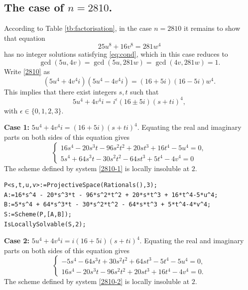 \documentclass[a4paper,12pt,english,reqno]{amsart}
\begin{document}
\subsection{The case of $n=2810$.}%
According to Table \ref{tb:factorisation}, in the case $n=2810$ it remains to
show that equation 
\begin{equation}\label{2810}
25 u^8 + 16 v^8=281  w^4
\end{equation}
has no integer solutions satisfying \eqref{eq:cond}, which in this case reduces to \[\gcd(5u,4v)=\gcd(5u,281w)=\gcd(4v,281w)=1.\]   Write \eqref{2810} as
\begin{equation} (5u^4+4v^4i)(5u^4-4v^4i)=(16+5i)(16-5i)w^4.
\end{equation}
This implies that there exist integers $s,t$ such that 
\[5u^4+4v^4i=i^{\epsilon}(16\pm 5i)(s+ti)^4,\]
with $\epsilon \in \{0,1,2,3\}$.


{\bf Case 1:} $5u^4+4v^4i=(16+5i)(s+ti)^4$. Equating the real and imaginary parts on both sides of this equation gives
\begin{equation}\label{2810-1}
\begin{cases}
16s^4 - 20s^3t - 96s^2t^2 + 20st^3 + 16t^4 - 5u^4=0,\\
5s^4 + 64s^3t - 30s^2t^2 - 64st^3 + 5t^4 - 4v^4=0
\end{cases}
\end{equation}
The scheme defined by system \eqref{2810-1} is locally insoluble at $2$.

\begin{lstlisting}
P<s,t,u,v>:=ProjectiveSpace(Rationals(),3);
A:=16*s^4 - 20*s^3*t - 96*s^2*t^2 + 20*s*t^3 + 16*t^4-5*u^4;
B:=5*s^4 + 64*s^3*t - 30*s^2*t^2 - 64*s*t^3 + 5*t^4-4*v^4;
S:=Scheme(P,[A,B]);
IsLocallySolvable(S,2);
\end{lstlisting}

{\bf Case 2:} $5u^4+4v^4i=i(16+5i)(s+ti)^4$. Equating the real and imaginary parts on both sides of this equation gives
\begin{equation}\label{2810-2}
\begin{cases}
-5s^4 - 64s^3t + 30s^2t^2 + 64st^3 - 5t^4 - 5u^4=0,\\
16s^4 - 20s^3t - 96s^2t^2 + 20st^3 + 16t^4 - 4v^4=0.
\end{cases}
\end{equation}
The scheme defined by system \eqref{2810-2} is locally insoluble at $2$.
\end{document}

